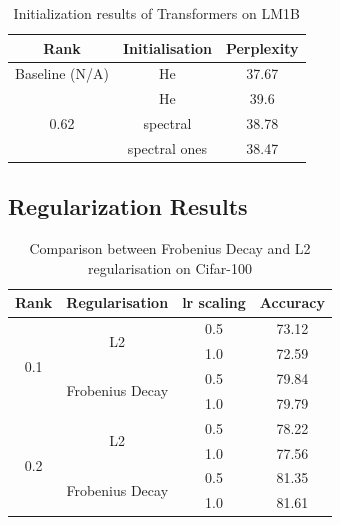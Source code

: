 \documentclass{article}
\begin{document}
\begin{table}[h]
\centering
\begin{tabular}{|c|c|c|}
\hline
\textbf{Rank} & \textbf{Initialisation} & \textbf{Perplexity} \\
\hline
Baseline (N/A) & He & 37.67\\
\hline
\multirow{3}{*}{0.62} & He   & 39.6\\
                & spectral   & 38.78 \\
                   & spectral ones  & 38.47 \\
\hline
\end{tabular}
\caption{Initialization results of Transformers on LM1B}
\label{transformer_init}
\end{table}

\subsection{Regularization Results}
\begin{table}[h]
\centering
\begin{tabular}{|c|c|c|c|}
\hline
Rank & \textbf{Regularisation} & \textbf{lr scaling} & \textbf{Accuracy} \\
\hline
\hline

\multirow{4}{*}{0.1} &  \multirow{2}{*}{L2} & 0.5 & 73.12 \\
                     &                       & 1.0 & 72.59 \\
\cline{2-4}
                     &  \multirow{2}{*}{Frobenius Decay} & 0.5 & 79.84 \\
                     &                       & 1.0 & 79.79 \\
\hline

\multirow{4}{*}{0.2} &  \multirow{2}{*}{L2} & 0.5 & 78.22 \\
                     &                       & 1.0 & 77.56 \\
\cline{2-4}
                     &  \multirow{2}{*}{Frobenius Decay} & 0.5 & 81.35 \\
                     &                       & 1.0 & 81.61 \\
\hline

\end{tabular}
\caption{Comparison between Frobenius Decay and L2 regularisation on Cifar-100}
\label{wrn_l2}
\end{table}
\end{document}
